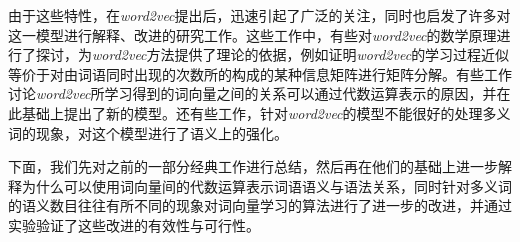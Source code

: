 由于这些特性，在\emph{word2vec}提出后，迅速引起了广泛的关注，同时也启发了许多对这一模型进行解释、改进的研究工作\citep{li2015word,levy2014neural,pennington2014glove,huang2012improving}。这些工作中，有些对\emph{word2vec}的数学原理进行了探讨，为\emph{word2vec}方法提供了理论的依据，例如\citep{li2015word,levy2014neural}证明\emph{word2vec}的学习过程近似等价于对由词语同时出现的次数所的构成的某种信息矩阵进行矩阵分解。有些工作讨论\emph{word2vec}所学习得到的词向量之间的关系可以通过代数运算表示的原因，并在此基础上提出了新的模型\citep{pennington2014glove}。还有些工作，针对\emph{word2vec}的模型不能很好的处理多义词的现象，对这个模型进行了语义上的强化\citep{huang2012improving}。

下面，我们先对之前的一部分经典工作进行总结，然后再在他们的基础上进一步解释为什么可以使用词向量间的代数运算表示词语语义与语法关系，同时针对多义词的语义数目往往有所不同的现象对词向量学习的算法进行了进一步的改进，并通过实验验证了这些改进的有效性与可行性。